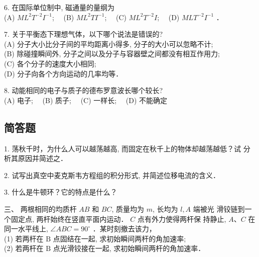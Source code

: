 6. 在国际单位制中, 磁通量的量纲为\\
(A) $M L^{2} T^{-2} I^{-1}$;$\quad$
(B) $M L^{2} T I^{-1}$;$\quad$
(C) $M L^{2} T^{-2} I$;$\quad$
(D) $M L T^{-2} I^{-1}$ ．

7. 关于平衡态下理想气体，以下哪个说法是错误的?\\
(A) 分子大小比分子间的平均距离小得多, 分子的大小可以忽略不计;\\
(B) 除碰撞瞬间外, 分子之间以及分子与容器壁之间都没有相互作用力;\\
(C) 各个分子的速度大小相同;\\
(D) 分子向各个方向运动的几率均等．

8. 动能相同的电子与质子的德布罗意波长哪个较长?\\
(A) 电子;$\quad$
(B) 质子;$\quad$
(C) 一样长;$\quad$
(D) 不能确定

\subsection{简答题}

1. 荡秋千时，为什么人可以越荡越高, 而固定在秋千上的物体却越荡越低？试 分析其原因并简述之．

2. 试写出真空中麦克斯韦方程组的积分形式, 并简述位移电流的含义．

3. 什么是牛顿环？它的特点是什么？

三、 两根相同的均质杆 $A B$ 和 $B C$, 质量均为 $m$, 长均为 $l, A$ 端被光 滑铰链到一个固定点, 两杆始终在竖直平面内运动． $C$ 点有外力使得两杆保
持静止, $A $、$ C$ 在同一水平线上, $\angle A B C=90^{\circ}$ ．某时刻撤去该力，\\
(1) 若两杆在 $\mathrm{B}$ 点固结在一起, 求初始瞬间两杆的角加速率;\\
(2) 若两杆在 $\mathrm{B}$ 点光滑铰接在一起, 求初始瞬间两杆的角加速率．